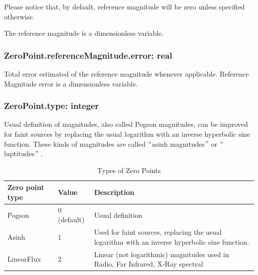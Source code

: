 \documentclass[11pt,a4paper]{ivoa}
\begin{document}
Please notice that, by default, reference magnitude will be zero unless
specified otherwise.
\par

The reference magnitude is a dimensionless variable.
\par

\subsubsection{ZeroPoint.referenceMagnitude.error: real}
Total error estimated of the reference magnitude whenever applicable. Reference
Magnitude error is a dimensionless variable.\par

\subsubsection{ZeroPoint.type: integer}
Usual definition of magnitudes, also called Pogson magnitudes, can be improved
for faint sources by replacing the usual logarithm with an inverse hyperbolic
sine function. These kinds of magnitudes are called $``$asinh magnitudes$"$
or $``$luptitudes$"$  \citep{2004A&A...422..205G}.\par



\begin{table}[ht]
 			\centering
\begin{tabular}{p{2.42in}p{0.8in}p{1.55in}}
\hline
\multicolumn{1}{|p{2.42in}}{Zero point type} &
\multicolumn{1}{|p{0.8in}}{Value} &
\multicolumn{1}{|p{1.55in}|}{Description} \\
\hline
\multicolumn{1}{|p{2.42in}}{Pogson} &
\multicolumn{1}{|p{0.8in}}{0 (default)} &
\multicolumn{1}{|p{1.55in}|}{Usual definition} \\
\hline
\multicolumn{1}{|p{2.42in}}{Asinh} &
\multicolumn{1}{|p{0.8in}}{1} &
\multicolumn{1}{|p{1.55in}|}{Used for faint sources, replacing the usual
logarithm with an inverse hyperbolic sine function.} \\
\hline
\multicolumn{1}{|p{2.42in}}{LinearFlux} &
\multicolumn{1}{|p{0.8in}}{2} &
\multicolumn{1}{|p{1.55in}|}{Linear (not logarithmic) magnitudes used in
Radio, Far Infrared, X-Ray spectral } \\
\hline
\end{tabular}
\caption{Types of Zero Points}
 \end{table}
\end{document}
